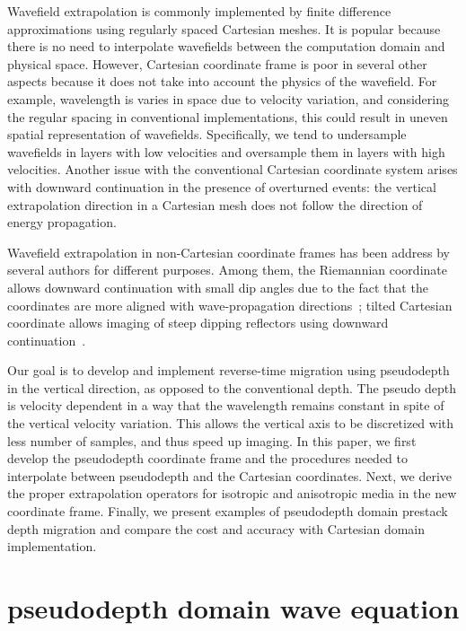 Wavefield extrapolation is commonly implemented by finite difference approximations using regularly spaced Cartesian meshes.
It is popular because there is no need to interpolate wavefields between the computation domain and physical space.
However, Cartesian coordinate frame is poor in several other aspects because it does not take into account the physics of the wavefield. For example, wavelength is varies in space due to velocity variation, and considering the regular spacing in conventional implementations, 
this could result in uneven spatial representation of wavefields. 
Specifically, we tend to undersample wavefields in layers with low velocities and oversample them in layers with high velocities. 
Another issue with the conventional Cartesian coordinate system arises with downward continuation in the presence of overturned events: the vertical 
extrapolation direction in a Cartesian mesh does not follow the direction of energy propagation.

Wavefield extrapolation in non-Cartesian coordinate frames has been address by several authors for different purposes. Among them, the Riemannian coordinate allows downward continuation with small dip angles due to the fact that the coordinates are more aligned with wave-propagation directions~\cite[]{sava:T45,shragge:T11}; tilted Cartesian coordinate allows imaging of steep dipping reflectors using downward continuation~\cite[]{shan:S185}.

Our goal is to develop and implement reverse-time migration using pseudodepth in the vertical direction, as opposed to the conventional depth. 
The pseudo depth is velocity dependent in a way that the wavelength remains constant in spite of the vertical velocity variation.
This allows the vertical axis to be discretized with less number of samples, and thus speed up imaging.
In this paper, we first develop the pseudodepth coordinate frame and the procedures needed to interpolate between pseudodepth and the Cartesian coordinates.
Next, we derive the proper extrapolation operators for isotropic and anisotropic media in the new coordinate frame.
Finally, we present examples of pseudodepth domain prestack depth migration and compare the cost and accuracy with Cartesian domain implementation.

\section{pseudodepth domain wave equation}

